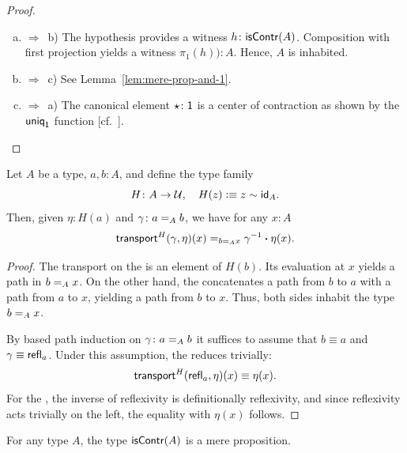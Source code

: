 \begin{proof}${}$
    \begin{enumerate}[a)]
        \item $\Rightarrow$~b) The hypothesis provides a witness $h\colon\fun{isContr}(A)$. Composition with first projection yields a witness $\pi_1(h))\colon A$. Hence, $A$ is inhabited.

        \item $\Rightarrow$~c) See Lemma~\ref{lem:mere-prop-and-1}.

        \item $\Rightarrow$~a) The canonical element $\fun\star\colon\fun1$ is a center of contraction as shown by the $\mathsf{uniq}_{\mathsf{1}}$ function [cf.~].
    \end{enumerate}
    
\end{proof}

\begin{lem}\label{lem:transport-prod-id}
    Let\/ $A$ be a type, $a,b\colon A$, and define the type family
    \[
        H\colon A\to\univ,\quad H(z)\defeq z\sim\id_A.
    \]
    Then, given\/ $\eta\colon H(a)$ and\/ $\gamma\colon a\eq{A}b$, we have for any\/ $x\colon A$
    \[
        \mathsf{transport}^H(\gamma,\eta)(x)\mathrel{=_{b\mathrel{=_{A}}x}}\gamma^{-1}\mathbin{\boldsymbol{\cdot}}\eta(x).
    \]
\end{lem}

\begin{proof}
    The transport on the \lhs is an element of $H(b)$. Its evaluation at $x$ yields a path in $b\mathrel{=_{A}}x$. On the other hand, the \rhs concatenates a path from $b$ to $a$ with a path from $a$ to $x$, yielding a path from $b$ to $x$. Thus, both sides inhabit the type $b\mathrel{=_{A}}x$.

    By based path induction on $\gamma\colon a\eq{A}b$ it suffices to assume that $b\equiv a$ and $\gamma\equiv\mathsf{refl}_a$. Under this assumption, the \lhs reduces trivially:
    \[
        \mathsf{transport}^H(\mathsf{refl}_a,\eta)(x)\equiv\eta(x).
    \]
    For the \rhs, the inverse of reflexivity is definitionally reflexivity, and since reflexivity acts trivially on the left, the equality with $\eta(x)$ follows.
\end{proof}

\begin{thm}\we\label{thm:isContr-is-a-mere-proposition}
    For any type\/ $A$, the type\/ $\mathsf{isContr}(A)$ is a mere proposition.
\end{thm}

